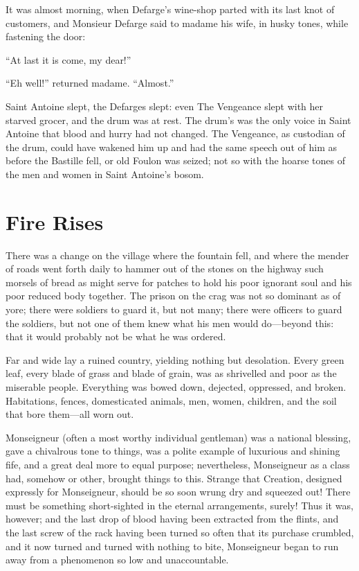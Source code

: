 It was almost morning, when Defarge's wine-shop parted with its last
knot of customers, and Monsieur Defarge said to madame his wife, in
husky tones, while fastening the door:

``At last it is come, my dear!''

``Eh well!'' returned madame.  ``Almost.''

Saint Antoine slept, the Defarges slept:  even The Vengeance slept with
her starved grocer, and the drum was at rest.  The drum's was the only
voice in Saint Antoine that blood and hurry had not changed.  The
Vengeance, as custodian of the drum, could have wakened him up and had
the same speech out of him as before the Bastille fell, or old Foulon
was seized; not so with the hoarse tones of the men and women in Saint
Antoine's bosom.



\chapter{Fire Rises}


There was a change on the village where the fountain fell, and where
the mender of roads went forth daily to hammer out of the stones on
the highway such morsels of bread as might serve for patches to hold
his poor ignorant soul and his poor reduced body together.  The prison
on the crag was not so dominant as of yore; there were soldiers to guard
it, but not many; there were officers to guard the soldiers, but not
one of them knew what his men would do---beyond this:  that it would
probably not be what he was ordered.

Far and wide lay a ruined country, yielding nothing but desolation.
Every green leaf, every blade of grass and blade of grain, was as
shrivelled and poor as the miserable people.  Everything was bowed
down, dejected, oppressed, and broken.  Habitations, fences,
domesticated animals, men, women, children, and the soil that bore
them---all worn out.

Monseigneur (often a most worthy individual gentleman) was a national
blessing, gave a chivalrous tone to things, was a polite example of
luxurious and shining fife, and a great deal more to equal purpose;
nevertheless, Monseigneur as a class had, somehow or other, brought
things to this.  Strange that Creation, designed expressly for
Monseigneur, should be so soon wrung dry and squeezed out!  There must
be something short-sighted in the eternal arrangements, surely!  Thus
it was, however; and the last drop of blood having been extracted from
the flints, and the last screw of the rack having been turned so often
that its purchase crumbled, and it now turned and turned with nothing
to bite, Monseigneur began to run away from a phenomenon so low
and unaccountable.

